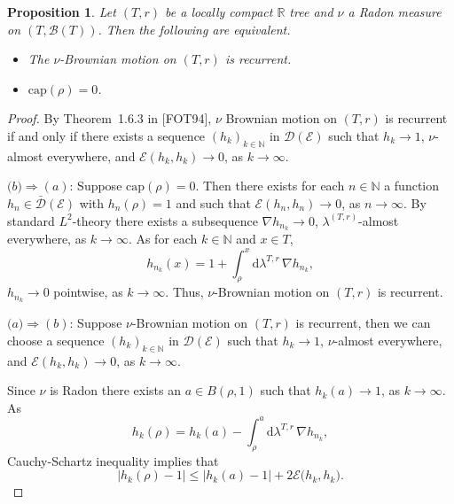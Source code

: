 \documentclass[11pt]{amsart}
\numberwithin{equation}{section}
\newtheorem{proposition}[definition]{Proposition}
\begin{document}
{\begin{proposition} \label{P:03}
Let $(T,r)$ be a locally compact ${{\mathbb R}}$ tree and $\nu$ a Radon measure on $(T,{\mathcal B}(T))$. Then the following are equivalent.
\begin{itemize}
\item[(a)] The $\nu$-Brownian motion on $(T,r)$ is recurrent.
\item[(b)] $\mathrm{cap}(\rho)=0$.
\end{itemize}
\end{proposition}{\smallskip}

{
\begin{proof}  By Theorem~1.6.3 in [FOT94], $\nu$ Brownian motion on $(T,r)$ is recurrent if and only if
there exists a sequence $(h_{{k}})_{k\in\mathbb{N}}$ in ${\mathcal D}({\mathcal E})$ such that $h_{{k}}\to 1$, $\nu$-almost everywhere, and
$\mathcal E(h_{{k}},h_{{k}})\to 0$, as $k\to\infty$.

{ $\mathbf (b) \Longrightarrow (a)$: }
Suppose $\mathrm{cap}(\rho)=0$. Then there exists for each $n\in\mathbb{N}$ a function $h_{n}\in\bar{\mathcal D}(\mathcal E)$ with $h_{n}(\rho) = 1$ and such that $\mathcal E(h_{n},h_{n}) \rightarrow 0$, as $n\to\infty$. By standard $L^{2}$-theory there exists a subsequence $\nabla h_{n_{k}}\rightarrow 0$, $\lambda^{(T,r)}$-almost everywhere, as $k\to\infty$. As for each $k\in\mathbb{N}$ and $x\in T$,
\begin{equation}
\label{l:031}
   h_{n_{k}}(x)
 =
   1+\int_{\rho}^{x}\mathrm{d}\lambda^{T,r}\, \nabla   h_{n_{k}},
\end{equation}
$h_{n_{k}}\to 0$ pointwise, as $k\to\infty$.
Thus, $\nu$-Brownian motion on $(T,r)$ is recurrent. {\smallskip}

{$\mathbf  (a) \Longrightarrow (b)$: }  Suppose $\nu$-Brownian motion on $(T,r)$ is recurrent, then we
can choose a sequence $(h_{{k}})_{k\in\mathbb{N}}$ in ${\mathcal D}({\mathcal E})$ such that $h_{{k}}\to 1$, $\nu$-almost everywhere, and
$\mathcal E(h_{{k}},h_{{k}})\to 0$, as $k\to\infty$.

Since $\nu$ is Radon there exists an $a\in B(\rho, 1)$ such that $h_{{k}}(a)\to 1$, as $k\to\infty$.
As
\begin{equation}
\label{l:032}
   h_{{k}}(\rho)
 =
   h_{{k}}(a)-\int_{\rho}^{a}\mathrm{d}\lambda^{T,r}\, \nabla   h_{n_{k}},
\end{equation}
Cauchy-Schartz inequality implies that
\begin{equation}
\label{l:033}
   |h_{{k}}(\rho)-1|
 \leq
   |h_{k}(a) -1|  + 2\mathcal E\big(h_{{k}},h_{{k}}\big).
\end{equation}


\end{proof}}}
\end{document}
